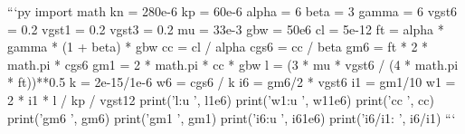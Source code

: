 ```py import math\markdownRendererInterblockSeparator
{}kn = 280e-6 kp = 60e-6\markdownRendererInterblockSeparator
{}alpha = 6 beta = 3 gamma = 6 vgst6 = 0.2 vgst1 = 0.2 vgst3 = 0.2\markdownRendererInterblockSeparator
{}mu = 33e-3\markdownRendererInterblockSeparator
{}gbw = 50e6 cl = 5e-12\markdownRendererInterblockSeparator
{}ft = alpha * gamma * (1 + beta) * gbw\markdownRendererInterblockSeparator
{}cc = cl / alpha cgs6 = cc / beta gm6 = ft * 2 * math.pi * cgs6 gm1 = 2 * math.pi * cc * gbw\markdownRendererInterblockSeparator
{}l = (3 * mu * vgst6 / (4 * math.pi * ft))**0.5\markdownRendererInterblockSeparator
{}k = 2e-15/1e-6 w6 = cgs6 / k i6 = gm6/2 * vgst6\markdownRendererInterblockSeparator
{}i1 = gm1/10\markdownRendererInterblockSeparator
{}w1 = 2 * i1 * l / kp / vgst12\markdownRendererInterblockSeparator
{}print('l:u ', l1e6) print('w1:u ', w11e6) print('cc ', cc) print('gm6 ', gm6) print('gm1 ', gm1) print('i6:u ', i61e6) print('i6/i1: ', i6/i1) ```\relax